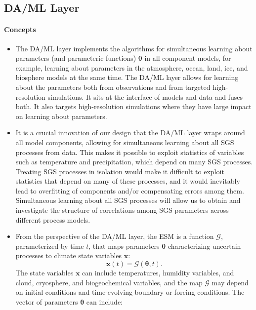 \documentclass{article}
\renewcommand{\vec}[1]{\boldsymbol{{#1}}}
\begin{document}
\subsection{DA/ML Layer}

\paragraph{Concepts}
\begin{itemize}
    \item The DA/ML layer implements the algorithms for simultaneous learning about parameters (and parameteric functions) $\vec{\theta}$ in all component models, for example, learning about parameters in the atmosphere, ocean, land, ice, and biosphere models at the same time. The DA/ML layer allows for learning about the parameters both from observations and from targeted high-resolution simulations. It sits at the interface of models and data and fuses both. It also targets high-resolution simulations where they have large impact on learning about parameters. 
    \item It is a crucial innovation of our design that the DA/ML layer wraps around all model components, allowing for simultaneous learning about all SGS processes from data. This makes it possible to exploit statistics of variables such as temperature and precipitation, which depend on many SGS processes. Treating SGS processes in isolation would make it difficult to exploit statistics that depend on many of these processes, and it would inevitably lead to overfitting of components and/or compensating errors among them. Simultaneous learning about all SGS processes will allow us to obtain and investigate the structure of correlations among SGS parameters across different process models.
    \item From the perspective of the DA/ML layer, the ESM is a function $\mathcal{G}$, parameterized by time $t$, that maps parameters $\vec{\theta}$ characterizing uncertain processes to climate state variables $\vec{x}$:
    \begin{equation}
    \vec{x}(t) = \mathcal{G}(\vec{\theta}, t).
    \end{equation}
    The state variables $\vec{x}$ can include temperatures, humidity variables, and cloud, cryosphere, and biogeochemical variables, and the map $\mathcal{G}$ may depend on initial conditions and time-evolving boundary or forcing conditions. The vector of parameters $\vec{\theta}$ can include:
        \begin{itemize}

\end{itemize}
\end{itemize}
\end{document}

